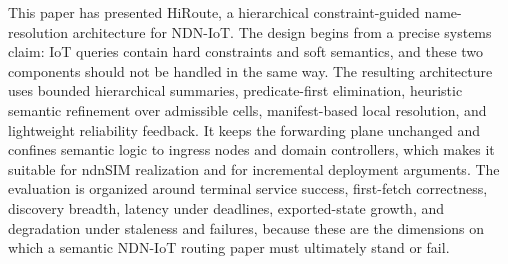 \documentclass[journal]{IEEEtran}
\newcommand{\sysname}{HiRoute}
\begin{document}
This paper has presented \sysname{}, a hierarchical constraint-guided name-resolution architecture for NDN-IoT. The design begins from a precise systems claim: IoT queries contain hard constraints and soft semantics, and these two components should not be handled in the same way. The resulting architecture uses bounded hierarchical summaries, predicate-first elimination, heuristic semantic refinement over admissible cells, manifest-based local resolution, and lightweight reliability feedback. It keeps the forwarding plane unchanged and confines semantic logic to ingress nodes and domain controllers, which makes it suitable for ndnSIM realization and for incremental deployment arguments. The evaluation is organized around terminal service success, first-fetch correctness, discovery breadth, latency under deadlines, exported-state growth, and degradation under staleness and failures, because these are the dimensions on which a semantic NDN-IoT routing paper must ultimately stand or fail.
\end{document}
